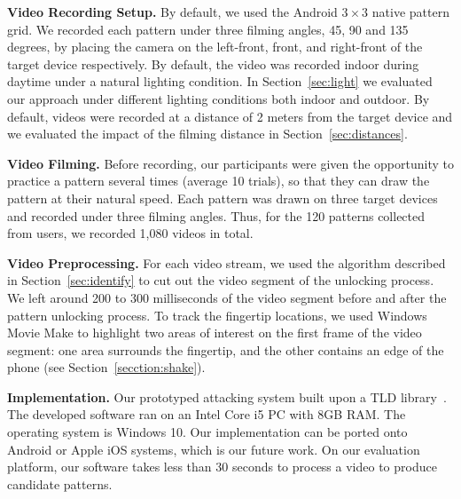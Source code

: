    \noindent\textbf{Video Recording Setup.}
    By default, we used the  Android $3 \times 3$ native pattern grid.
    We recorded each pattern under three filming
    angles, 45, 90 and 135 degrees, by placing the camera on the left-front, front, and right-front
    of the target device respectively.
    By default, the video
    was recorded indoor during daytime under a natural lighting condition. In
    Section~\ref{sec:light} we evaluated our approach under different lighting conditions
    both indoor and outdoor. By default, videos were recorded at a distance of
    2 meters from the target device and we evaluated the impact of the filming distance in
    Section~\ref{sec:distances}.

    \noindent \textbf{Video Filming.}
     Before recording, our participants were given the opportunity to practice a pattern
    several times (average 10 trials), so that they can draw the pattern at
    their natural speed.
    Each pattern was drawn on three target devices and
    recorded under three filming angles.
    Thus, for the 120 patterns collected from users, we recorded 1,080 videos in total.

    \noindent\textbf{Video Preprocessing.}
    For each video stream, we used the algorithm described in Section~\ref{sec:identify} to cut out the video segment
    of the unlocking process. We left around 200 to 300 milliseconds of the video segment before and after the pattern unlocking process.
    To track the fingertip locations,
    we used Windows Movie Make to highlight two areas of interest on the first frame of
    the video segment: one area surrounds the fingertip, and the other contains an edge of the
    phone (see Section~\ref {secction:shake}).

   \noindent\textbf{Implementation.} Our prototyped attacking system built upon a TLD library~\cite{TLD-toolbox-web}.
    The developed software ran on an Intel Core i5 PC with
    8GB RAM. The operating system is Windows 10. Our implementation can be ported onto
    Android or Apple iOS systems, which is our future work. On our evaluation
    platform, our software takes less than 30 seconds to process a video to produce candidate patterns.
